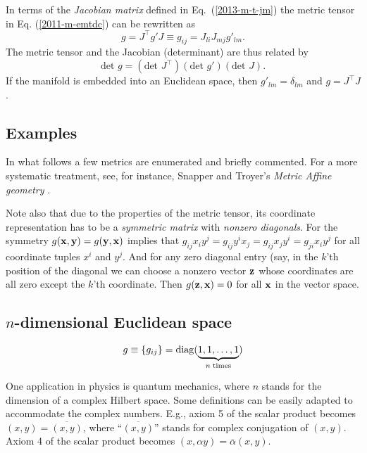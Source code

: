 In terms of the
{\em  Jacobian matrix} defined in Eq.~(\ref{2013-m-t-jm})
the metric tensor in Eq. (\ref{2011-m-emtdc})
can be rewritten as
\begin{equation}
g = J^\intercal  g' J
\equiv g_{ij}= J_{li}J_{mj}g'_{lm}
.
\label{2011-m-emtdcJ}
\end{equation}
The metric tensor and the Jacobian (determinant)
are thus related by
\begin{equation}
\textrm{det }g = (\textrm{det }J^\intercal ) (\textrm{det } g')(\textrm{det } J)
.
\label{2011-m-emtdcJd}
\end{equation}
If the manifold is embedded into an Euclidean space,
then $g'_{lm}=\delta_{lm}$
and  $g = J^\intercal   J $.

\subsection{Examples}

In what follows a few metrics are enumerated and briefly commented.
For a more systematic treatment, see, for instance, Snapper and Troyer's {\em Metric Affine geometry} \cite{snapper-troyer}.

Note also that due to the properties of the metric tensor, its coordinate representation has to be a {\em symmetric matrix}
with {\em nonzero diagonals}.
For the symmetry $g( {\bf x}  ,{\bf y} )=g({\bf y} ,{\bf x} )$ implies that $g_{ij}x_iy^j= g_{ij}y^ix_j=  g_{ij}x_jy^i= g_{ji}x_iy^j$ for all coordinate tuples
$x^i$ and $y^j$. And for any zero diagonal entry (say, in the $k$'th position of the diagonal we can choose a nonzero vector  ${\bf z}$
whose coordinates are all zero except the $k$'th coordinate. Then $g ({\bf z},{\bf x})=0$ for all ${\bf x}$ in the vector space.


\subsection*{$n$-dimensional Euclidean space}

\begin{equation}
g\equiv \{g_{ij}\}={\rm diag} (\underbrace{1,1,\ldots ,1}_{n\; {\rm times}})
\end{equation}

One application in physics is quantum mechanics,
where $n$ stands for the dimension of a complex Hilbert space.
Some definitions can be easily adapted to accommodate the complex numbers.
E.g., axiom 5 of the scalar product becomes
$(x,y)=\overline{(x,y)}$, where ``$\overline{(x,y)}$'' stands for complex conjugation of $(x,y)$.
Axiom 4 of the scalar product becomes
$(x,\alpha y)=\overline{\alpha} (x,y)$.

